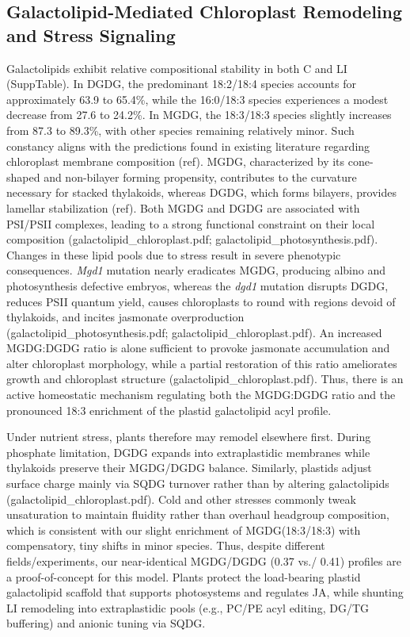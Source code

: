 \documentclass[10pt,letterpaper]{article}
\begin{document}
\begin{itemize}
\subsection*{Galactolipid-Mediated Chloroplast Remodeling and Stress Signaling}
Galactolipids exhibit relative compositional stability in both C and LI (SuppTable). In DGDG, the predominant 18:2/18:4 species accounts for approximately 63.9 to 65.4\%, while the 16:0/18:3 species experiences a modest decrease from 27.6 to 24.2\%. In MGDG, the 18:3/18:3 species slightly increases from 87.3 to 89.3\%, with other species remaining relatively minor. Such constancy aligns with the predictions found in existing literature regarding chloroplast membrane composition (ref). MGDG, characterized by its cone-shaped and non-bilayer forming propensity, contributes to the curvature necessary for stacked thylakoids, whereas DGDG, which forms bilayers, provides lamellar stabilization (ref). Both MGDG and DGDG are associated with PSI/PSII complexes, leading to a strong functional constraint on their local composition (galactolipid\_chloroplast.pdf; galactolipid\_photosynthesis.pdf). Changes in these lipid pools due to stress result in severe phenotypic consequences. \textit{Mgd1} mutation nearly eradicates MGDG, producing albino and photosynthesis defective embryos, whereas the \textit{dgd1} mutation disrupts DGDG, reduces PSII quantum yield, causes chloroplasts to round with regions devoid of thylakoids, and incites jasmonate overproduction (galactolipid\_photosynthesis.pdf; galactolipid\_chloroplast.pdf). An increased MGDG:DGDG ratio is alone sufficient to provoke jasmonate accumulation and alter chloroplast morphology, while a partial restoration of this ratio ameliorates growth and chloroplast structure (galactolipid\_chloroplast.pdf). Thus, there is an active homeostatic mechanism regulating both the MGDG:DGDG ratio and the pronounced 18:3 enrichment of the plastid galactolipid acyl profile.

Under nutrient stress, plants therefore may remodel elsewhere first. During phosphate limitation, DGDG expands into extraplastidic membranes while thylakoids preserve their MGDG/DGDG balance. Similarly, plastids adjust surface charge mainly via SQDG turnover rather than by altering galactolipids (galactolipid\_chloroplast.pdf). Cold and other stresses commonly tweak unsaturation to maintain fluidity rather than overhaul headgroup composition, which is consistent with our slight enrichment of MGDG(18:3/18:3) with compensatory, tiny shifts in minor species. Thus, despite different fields/experiments, our near-identical MGDG/DGDG (0.37 vs./ 0.41) profiles are a proof-of-concept for this model. Plants protect the load-bearing plastid galactolipid scaffold that supports photosystems and regulates JA, while shunting LI remodeling into extraplastidic pools (e.g., PC/PE acyl editing, DG/TG buffering) and anionic tuning via SQDG. 


\end{itemize}
\end{document}
